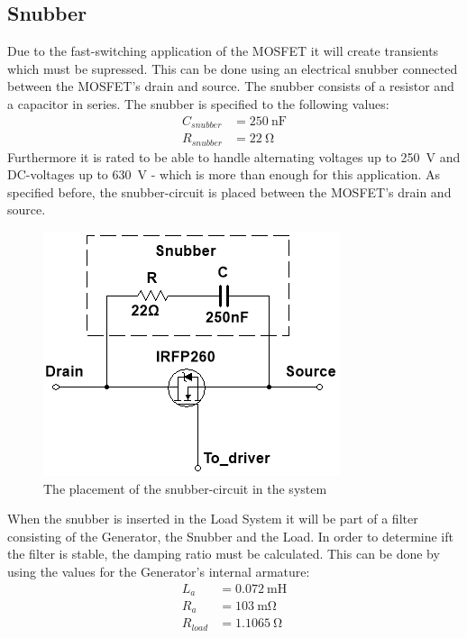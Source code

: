 \newpage
\subsection{Snubber}
Due to the fast-switching application of the MOSFET it will create transients which must be supressed. This can be done using an electrical snubber connected between the MOSFET's drain and source. The snubber consists of a resistor and a capacitor in series\cite{Snubber}. The snubber is specified to the following values:
\begin{equation}
	\begin{split}
		C_{snubber} &= \SI{250}{\nano \farad}\\
		R_{snubber} &= \SI{22}{\ohm}
	\end{split}
\end{equation}
Furthermore it is rated to be able to handle alternating voltages up to \SI{250}{\volt} and DC-voltages up to \SI{630}{\volt} - which is more than enough for this application. As specified before, the snubber-circuit is placed between the MOSFET's drain and source.

\begin{figure}[H]
	\centering
	\includegraphics[width=0.5\linewidth]{Hardware/LoadSystem/Snubber}
	\caption{The placement of the snubber-circuit in the system}
	\label{fig:SnubberCircuit}
\end{figure}

When the snubber is inserted in the Load System it will be part of a filter consisting of the Generator, the Snubber and the Load. In order to determine ift the filter is stable, the damping ratio must be calculated. This can be done by using the values for the Generator's internal armature\cite{Maxon}: 
\begin{equation}
	\begin{split}
		L_a &= \SI{0.072}{\milli \henry}\\
		R_a &= \SI{103}{\milli \ohm}\\
		R_{load} &= \SI{1.1065}{\ohm}
	\end{split}
\end{equation}

